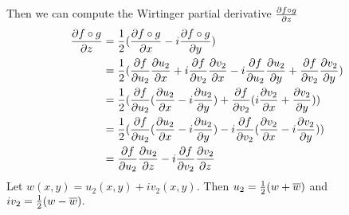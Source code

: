 \documentclass{homework}
\begin{document}
\begin{solution}
                                                                                                             Then we can compute the Wirtinger partial derivative $\frac{\partial f\circ g}{\partial z}$
                                                                                                             \begin{align*} 
                                                                                                             \frac{\partial f\circ g}{\partial z} &= \frac{1}{2}(\frac{\partial f\circ g}{\partial x} - i \frac{\partial f\circ g}{\partial y})\\
                                                                                                             &= \frac{1}{2}(\frac{\partial f}{\partial u_2}\frac{\partial u_2}{\partial x} + i\frac{\partial f}{\partial v_2}\frac{\partial v_2}{\partial x} -  i\frac{\partial f}{\partial u_2}\frac{\partial u_2}{\partial y} + \frac{\partial f}{\partial v_2}\frac{\partial v_2}{\partial y})\\
                                                                                                             &= \frac{1}{2}(\frac{\partial f}{\partial u_2}(\frac{\partial u_2}{\partial x} -i\frac{\partial u_2}{\partial y}) + \frac{\partial f}{\partial v_2}(i\frac{\partial v_2}{\partial x} + \frac{\partial v_2}{\partial y}))\\
                                                                                                             &= \frac{1}{2}(\frac{\partial f}{\partial u_2}(\frac{\partial u_2}{\partial x} -i\frac{\partial u_2}{\partial y}) - i\frac{\partial f}{\partial v_2}(\frac{\partial v_2}{\partial x} - i\frac{\partial v_2}{\partial y}))\\
                                                                                                             &= \frac{\partial f}{\partial u_2}\frac{\partial u_2}{\partial z} - i\frac{\partial f}{\partial v_2}\frac{\partial v_2}{\partial z}
                                                                                                             \end{align*}
                                                                                                             Let $w(x, y) = u_2(x, y) + iv_2(x, y).$ Then $u_2 = \frac{1}{2}(w + \overline{w})$ and $iv_2 = \frac{1}{2}(w - \overline{w}).$


\end{solution}
\end{document}
